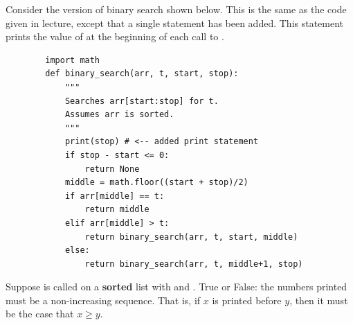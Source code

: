 \begin{prob}
    Consider the version of binary search shown below. This is the same as
    the code given in lecture, except that a single  statement
    has been added. This  statement prints the value of
     at the beginning of each call to .

    \begin{verbatim}
        import math
        def binary_search(arr, t, start, stop):
            """
            Searches arr[start:stop] for t.
            Assumes arr is sorted.
            """
            print(stop) # <-- added print statement
            if stop - start <= 0:
                return None
            middle = math.floor((start + stop)/2)
            if arr[middle] == t:
                return middle
            elif arr[middle] > t:
                return binary_search(arr, t, start, middle)
            else:
                return binary_search(arr, t, middle+1, stop)
    \end{verbatim}

    Suppose  is called on a \textbf{sorted} list with
     and . True or False: the numbers
    printed must be a non-increasing sequence. That is, if $x$ is printed
    before $y$, then it must be the case that $x \geq y$.

    \Tf{}

\end{prob}
